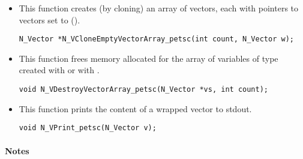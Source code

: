 \begin{itemize}

\item {}
 
  This function creates (by cloning) an array of  {\nvecpetsc} vectors,
  each with pointers to {\petsc} vectors set to ().
 
\begin{verbatim}
N_Vector *N_VCloneEmptyVectorArray_petsc(int count, N_Vector w);
\end{verbatim}


\item {}
 
 This function frees memory allocated for the array of  variables of
 type  created with  or with
 .
 

 \verb|void N_VDestroyVectorArray_petsc(N_Vector *vs, int count);|



\item {}
  
  This function prints the content of a wrapped {\petsc} vector to stdout.
 
    
  \verb|void N_VPrint_petsc(N_Vector v);|


\end{itemize}
\paragraph{\bf Notes} 
           
